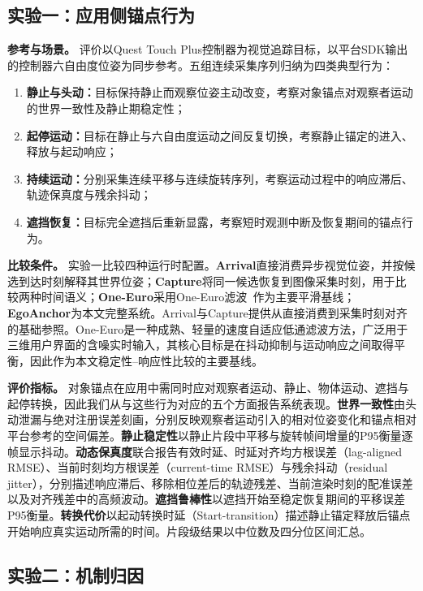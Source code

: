 \documentclass[review]{vgtc}
\begin{document}
\subsection{实验一：应用侧锚点行为}\label{sec:exp1-design}

\textbf{参考与场景。}
评价以Quest Touch Plus控制器为视觉追踪目标，以平台SDK输出的控制器六自由度位姿为同步参考。五组连续采集序列归纳为四类典型行为：
\begin{enumerate}
  \item \textbf{静止与头动：}目标保持静止而观察位姿主动改变，考察对象锚点对观察者运动的世界一致性及静止期稳定性；
  \item \textbf{起停运动：}目标在静止与六自由度运动之间反复切换，考察静止锚定的进入、释放与起动响应；
  \item \textbf{持续运动：}分别采集连续平移与连续旋转序列，考察运动过程中的响应滞后、轨迹保真度与残余抖动；
  \item \textbf{遮挡恢复：}目标完全遮挡后重新显露，考察短时观测中断及恢复期间的锚点行为。
\end{enumerate}

\textbf{比较条件。}
实验一比较四种运行时配置。\textbf{Arrival}直接消费异步视觉位姿，并按候选到达时刻解释其世界位姿；\textbf{Capture}将同一候选恢复到图像采集时刻，用于比较两种时间语义；\textbf{One-Euro}采用One-Euro滤波~\cite{casiez2012oneeuro}作为主要平滑基线；\textbf{EgoAnchor}为本文完整系统。Arrival与Capture提供从直接消费到采集时刻对齐的基础参照。One-Euro是一种成熟、轻量的速度自适应低通滤波方法，广泛用于三维用户界面的含噪实时输入，其核心目标是在抖动抑制与运动响应之间取得平衡，因此作为本文稳定性--响应性比较的主要基线。

\textbf{评价指标。}
对象锚点在应用中需同时应对观察者运动、静止、物体运动、遮挡与起停转换，因此我们从与这些行为对应的五个方面报告系统表现。\textbf{世界一致性}由头动泄漏与绝对注册误差刻画，分别反映观察者运动引入的相对位姿变化和锚点相对平台参考的空间偏差。\textbf{静止稳定性}以静止片段中平移与旋转帧间增量的P95衡量逐帧显示抖动。\textbf{动态保真度}联合报告有效时延、时延对齐均方根误差（lag-aligned RMSE）、当前时刻均方根误差（current-time RMSE）与残余抖动（residual jitter），分别描述响应滞后、移除相位差后的轨迹残差、当前渲染时刻的配准误差以及对齐残差中的高频波动。\textbf{遮挡鲁棒性}以遮挡开始至稳定恢复期间的平移误差P95衡量。\textbf{转换代价}以起动转换时延（Start-transition）描述静止锚定释放后锚点开始响应真实运动所需的时间。片段级结果以中位数及四分位区间汇总。

\subsection{实验二：机制归因}\label{sec:exp2-design}
\end{document}
